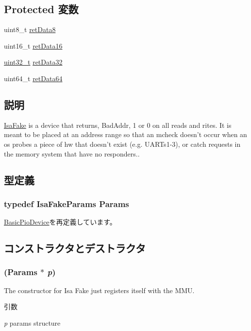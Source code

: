 \subsection*{Protected 変数}
\begin{DoxyCompactItemize}
\item 
uint8\_\-t \hyperlink{classIsaFake_ab214e69fe2d47c76466577f491122f50}{retData8}
\item 
uint16\_\-t \hyperlink{classIsaFake_a6a50681a9e818e6de256e0b428d031d4}{retData16}
\item 
\hyperlink{Type_8hh_a435d1572bf3f880d55459d9805097f62}{uint32\_\-t} \hyperlink{classIsaFake_aff159069c738217f75e3bdf4048b7c20}{retData32}
\item 
uint64\_\-t \hyperlink{classIsaFake_a491508c3b16897f4ff96ef1ea2b2bebc}{retData64}
\end{DoxyCompactItemize}


\subsection{説明}
\hyperlink{classIsaFake}{IsaFake} is a device that returns, BadAddr, 1 or 0 on all reads and rites. It is meant to be placed at an address range so that an mcheck doesn't occur when an os probes a piece of hw that doesn't exist (e.g. UARTs1-\/3), or catch requests in the memory system that have no responders.. 

\subsection{型定義}
\hypertarget{classIsaFake_a9d89a786405f83fe384e7aadc17d5ce2}{
\subsubsection[{Params}]{\setlength{\rightskip}{0pt plus 5cm}typedef IsaFakeParams {\bf Params}}}
\label{classIsaFake_a9d89a786405f83fe384e7aadc17d5ce2}


\hyperlink{classBasicPioDevice_a2845515ac6467f10540747053c8a0449}{BasicPioDevice}を再定義しています。

\subsection{コンストラクタとデストラクタ}
\hypertarget{classIsaFake_a156ba05e64791b9db37902f932519e30}{
\subsubsection[{IsaFake}]{ ({\bf Params} $\ast$ {\em p})}}
\label{classIsaFake_a156ba05e64791b9db37902f932519e30}
The constructor for Isa Fake just registers itself with the MMU. 
\begin{DoxyParams}{引数}
\item[{\em p}]params structure \end{DoxyParams}



